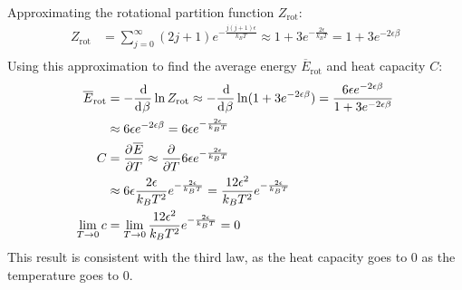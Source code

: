 \documentclass{article}
\begin{document}
Approximating the rotational partition function $Z_{\text{rot}}$:
\begin{equation}
    \begin{split}
        Z_{\text{rot}} & = \sum_{j=0}^{\infty} (2j + 1)e^{-\frac{j(j + 1)\epsilon}{k_BT}}  \approx 1 + 3e^{-\frac{2\epsilon}{k_BT}} = 1 + 3e^{-2\epsilon\beta} \\
    \end{split}
\end{equation}
Using this approximation to find the average energy $\overline{E}_{\text{rot}}$ and heat capacity $C$:
\begin{equation}
    \begin{split}
        \overline{E}_{\text{rot}} & = -\deriv{}{\beta}\ln Z_{\text{rot}} \approx -\deriv{}{\beta}\ln(1 + 3e^{-2\epsilon\beta}) = \frac{6\epsilon e^{-2\epsilon\beta}}{1 + 3e^{-2\epsilon\beta}} \\
        & \approx 6\epsilon e^{-2\epsilon\beta} = 6\epsilon e^{-\frac{2\epsilon}{k_BT}} \\
        C & = \pderiv{\overline{E}}{T} \approx \pderiv{}{T} 6\epsilon e^{-\frac{2\epsilon}{k_BT}} \\
        & \approx 6\epsilon \frac{2\epsilon}{k_BT^2}e^{-\frac{2\epsilon}{k_BT}} = \frac{12\epsilon^2}{k_BT^2}e^{-\frac{2\epsilon}{k_BT}} \\
        \lim_{T\to 0} c & = \lim_{T \to 0} \frac{12\epsilon^2}{k_BT^2}e^{-\frac{2\epsilon}{k_BT}} = 0
    \end{split}
\end{equation}
This result is consistent with the third law, as the heat capacity goes to $0$ as the temperature goes to $0$.

\end{document}
